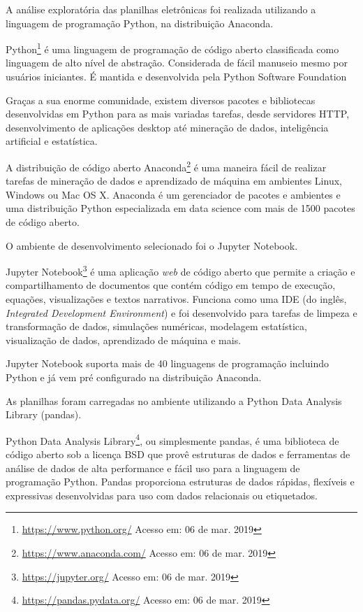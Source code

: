 A análise exploratória das planilhas eletrônicas foi realizada utilizando a
linguagem de programação Python, na distribuição Anaconda.

Python\footnote{\url{https://www.python.org/} Acesso em: 06 de mar. 2019} é uma
linguagem de programação de código aberto classificada como linguagem de alto
nível de abstração. Considerada de fácil manuseio mesmo por usuários iniciantes.
É mantida e desenvolvida pela Python Software Foundation

Graças a sua enorme comunidade, existem diversos pacotes e bibliotecas
desenvolvidas em Python para as mais variadas tarefas, desde servidores HTTP,
desenvolvimento de aplicações desktop até mineração de dados, inteligência
artificial e estatística.

A distribuição de código aberto
Anaconda\footnote{\url{https://www.anaconda.com/} Acesso em: 06 de mar. 2019}  é
uma maneira fácil de realizar tarefas de mineração de dados e aprendizado de
máquina em ambientes Linux, Windows ou Mac OS X. Anaconda é um gerenciador de
pacotes e ambientes e uma distribuição Python especializada em data science com
mais de 1500 pacotes de código aberto.

O ambiente de desenvolvimento selecionado foi o Jupyter Notebook.

Jupyter Notebook\footnote{\url{https://jupyter.org/} Acesso em: 06 de mar. 2019}
é uma aplicação \textit{web} de código aberto que permite a criação e
compartilhamento de documentos que contém código em tempo de execução, equações,
visualizações e textos narrativos. Funciona como uma IDE (do inglês,
\textit{Integrated Development Environment}) e foi desenvolvido para tarefas de
limpeza e transformação de dados, simulações numéricas, modelagem estatística,
visualização de dados, aprendizado de máquina e mais.

Jupyter Notebook suporta mais de 40 linguagens de programação incluindo Python e
já vem pré configurado na distribuição Anaconda.

As planilhas foram carregadas no ambiente utilizando a Python Data Analysis
Library (pandas).

Python Data Analysis Library\footnote{\url{https://pandas.pydata.org/} Acesso
em: 06 de mar. 2019}, ou simplesmente pandas, é uma biblioteca de código aberto
sob a licença BSD que provê estruturas de dados e ferramentas de análise de
dados de alta performance e fácil uso para a linguagem de programação Python.
Pandas proporciona estruturas de dados rápidas, flexíveis e expressivas
desenvolvidas para uso com dados relacionais ou etiquetados.

